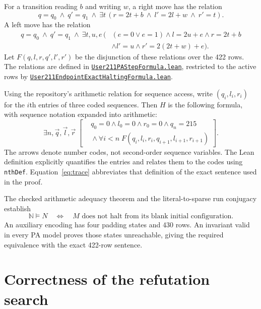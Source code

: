 \documentclass[11pt,letterpaper]{article}
\newcommand{\NN}{\mathbb{N}}
\newcommand{\src}[2]{\href{https://github.com/jamesyc/BusyBeaver/blob/main/#1}{\texttt{\nolinkurl{#2}}}}
\begin{document}
For a transition reading $b$ and writing $w$, a right move has the relation
\[
q=q_0\ \land\ q'=q_1\ \land\
\exists t\,(r=2t+b\ \land\ l'=2l+w\ \land\ r'=t).
\]
A left move has the relation
\begin{align*}
q=q_0\ \land\ q'=q_1\ \land\ \exists t,u,e\,(& (e=0\lor e=1)
\land l=2u+e\land r=2t+b\\
&\land l'=u\land r'=2(2t+w)+e).
\end{align*}
Let $F(q,l,r,q',l',r')$ be the disjunction of these relations over the
422 rows. The relations are defined in
\src{Lean/metamathematics/User211PAStepFormula.lean}{User211PAStepFormula.lean},
restricted to the active rows by
\src{Lean/metamathematics/User211EndpointExactHaltingFormula.lean}{User211EndpointExactHaltingFormula.lean}.

Using the repository's arithmetic relation for sequence access, write
$(q_i,l_i,r_i)$ for the $i$th entries of three coded sequences. Then $H$
is the following formula, with sequence notation expanded into arithmetic:
\begin{equation}\label{eq:trace}
\exists n,\vec q,\vec l,\vec r\;
\left[
\begin{aligned}
&q_0=0\land l_0=0\land r_0=0\land q_n=215\ \\
&{}\land\forall i<n\;F(q_i,l_i,r_i,q_{i+1},l_{i+1},r_{i+1})
\end{aligned}\right].
\end{equation}
The arrows denote number codes, not second-order sequence variables.
The Lean definition explicitly quantifies the entries and relates them to
the codes using \texttt{nthDef}. Equation~\eqref{eq:trace} abbreviates that
definition of the exact sentence used in the proof.

The checked arithmetic adequacy theorem and the literal-to-sparse run
conjugacy establish
\begin{equation}\label{eq:adequacy}
\NN\models N\quad\Longleftrightarrow\quad
M\text{ does not halt from its blank initial configuration}.
\end{equation}
An auxiliary encoding has four padding states and 430 rows. An invariant
valid in every PA model proves those states unreachable, giving the
required equivalence with the exact 422-row sentence.

\section{Correctness of the refutation search}\label{sec:bridge}
\end{document}
